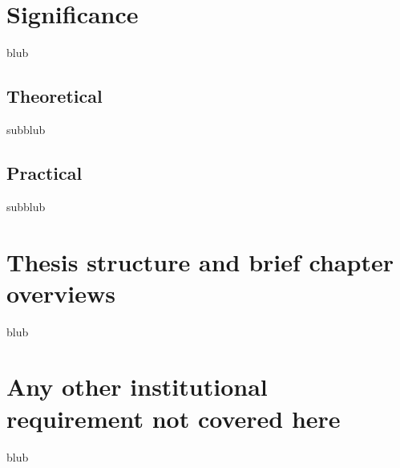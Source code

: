 
\section{Significance}

blub


\subsection{Theoretical}

subblub



\subsection{Practical}

subblub



\section{Thesis structure and brief chapter overviews}

blub



\section{Any other institutional requirement not covered here}

blub




